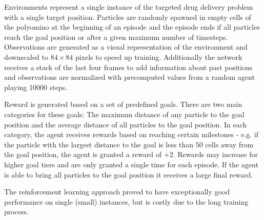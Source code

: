 Environments represent a single instance of the targeted drug delivery problem with a single target position. Particles are randomly spawned in empty cells of the polyomino at the beginning of an episode and the episode ends if all particles reach the goal position or after a given maximum number of timesteps. Observations are generated as a visual representation of the environment and downscaled to $84 \times 84$ pixels to speed up training. Additionally the network receives a stack of the last four frames to add information about past positions and observations are normalized with precomputed values from a random agent playing 10000 steps.

Reward is generated based on a set of predefined goals. There are two main categories for these goals: The maximum distance of any particle to the goal position and the average distance of all particles to the goal position. In each category, the agent receives rewards based on reaching certain milestones - e.g. if the particle with the largest distance to the goal is less than 50 cells away from the goal position, the agent is granted a reward of $+2$. Rewards may increase for higher goal tiers and are only granted a single time for each episode. If the agent is able to bring all particles to the goal position it receives a large final reward. 

The reinforcement learning approach proved to have exceptionally good performance on single (small) instances, but is costly due to the long training process. 
